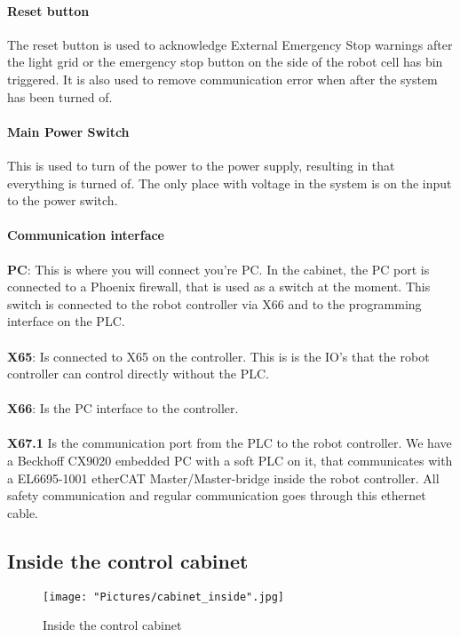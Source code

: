 \documentclass{article}
\begin{document}
        \paragraph{Reset button}
        The reset button is used to acknowledge External Emergency Stop warnings after the light grid or the emergency stop button on the side of the robot cell has bin triggered. It is also used to remove communication error when after the system has been turned of. 
        
        \paragraph{Main Power Switch}
        This is used to turn of the power to the power supply, resulting in that everything is turned of. The only place with voltage in the system is on the input to the power switch.
        
        \paragraph{Communication interface}
        \textbf{PC}: This is where you will connect you're PC. In the cabinet, the PC port is connected to a Phoenix firewall, that is used as a switch at the moment. This switch is connected to the robot controller via X66 and to the programming interface on the PLC.
        \\\\
        \textbf{X65}: Is connected to X65 on the controller. This is is the IO's that the robot controller can control directly without the PLC.
        \\\\
        \textbf{X66}: Is the PC interface to the controller.
        \\\\
        \textbf{X67.1} Is the communication port from the PLC to the robot controller. We have a Beckhoff CX9020 embedded PC with a soft PLC on it, that communicates with a EL6695-1001 etherCAT Master/Master-bridge inside the robot controller. All safety communication and regular communication goes through this ethernet cable.  
        
        \newpage
        
        \subsection{Inside the control cabinet }
        \begin{figure}[!h]
            \centering
            \texttt{[image: "Pictures/cabinet\_inside".jpg]}
            \caption{Inside the control cabinet}
        \end{figure}
        
\end{document}
